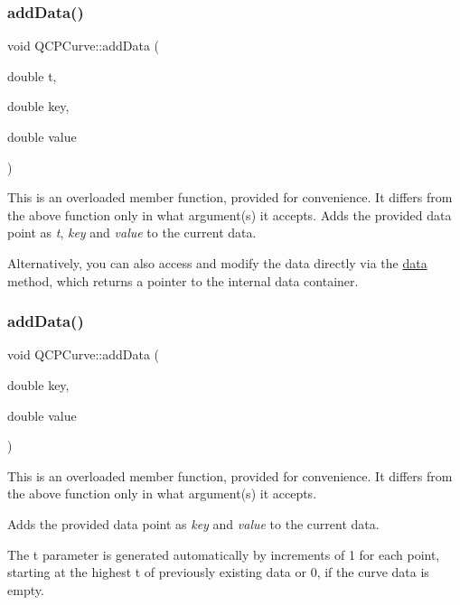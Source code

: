 \subsubsection{\texorpdfstring{add\+Data()}{addData()}\hspace{0.1cm}{\footnotesize\ttfamily [3/4]}}
{\footnotesize\ttfamily void Q\+C\+P\+Curve\+::add\+Data (\begin{DoxyParamCaption}\item[{double}]{t,  }\item[{double}]{key,  }\item[{double}]{value }\end{DoxyParamCaption})}

This is an overloaded member function, provided for convenience. It differs from the above function only in what argument(s) it accepts. Adds the provided data point as {\itshape t}, {\itshape key} and {\itshape value} to the current data.

Alternatively, you can also access and modify the data directly via the \hyperlink{class_q_c_p_curve_a761492fd00b1ab7cb18ce23c118c6c60}{data} method, which returns a pointer to the internal data container. \mbox{\label{class_q_c_p_curve_ada4762e793cd5707b33f35b8a4b0f8fb}} 
\subsubsection{\texorpdfstring{add\+Data()}{addData()}\hspace{0.1cm}{\footnotesize\ttfamily [4/4]}}
{\footnotesize\ttfamily void Q\+C\+P\+Curve\+::add\+Data (\begin{DoxyParamCaption}\item[{double}]{key,  }\item[{double}]{value }\end{DoxyParamCaption})}

This is an overloaded member function, provided for convenience. It differs from the above function only in what argument(s) it accepts.

Adds the provided data point as {\itshape key} and {\itshape value} to the current data.

The t parameter is generated automatically by increments of 1 for each point, starting at the highest t of previously existing data or 0, if the curve data is empty.

